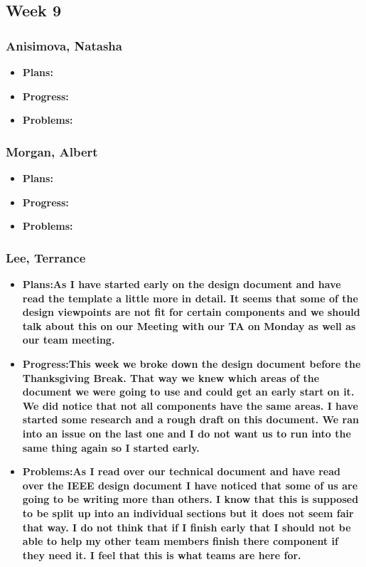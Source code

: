 \documentclass[10pt,draftclsnofoot,onecolumn]{IEEEtran}
\begin{document}
\subsection{Week 9}
\subsubsection{Anisimova, Natasha}
\begin{itemize}
	\item \textbf{Plans:}
	\item \textbf{Progress:}
	\item \textbf{Problems:}
\end{itemize}
\subsubsection{Morgan, Albert}
\begin{itemize}
	\item \textbf{Plans:}
	\item \textbf{Progress:}
	\item \textbf{Problems:}
\end{itemize}
\subsubsection{Lee, Terrance}
\begin{itemize}
	\item \textbf{Plans:As I have started early on the design document and have read the template a little more in detail. It seems that some of the design viewpoints are not fit for certain components and we should talk about this on our Meeting with our TA on Monday as well as our team meeting.}
	\item \textbf{Progress:This week we broke down the design document before the Thanksgiving Break. That way we knew which areas of the document we were going to use and could get an early start on it. We did notice that not all components have the same areas. I have started some research and a rough draft on this document. We ran into an issue on the last one and I do not want us to run into the same thing again so I started early.}
	\item \textbf{Problems:As I read over our technical document and have read over the IEEE design document I have noticed that some of us are going to be writing more than others. I know that this is supposed to be split up into an individual sections but it does not seem fair that way. I do not think that if I finish early that I should not be able to help my other team members finish there component if they need it. I feel that this is what teams are here for.}
\end{itemize}
\end{document}
